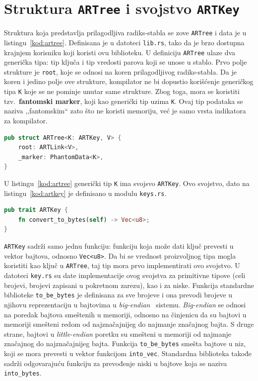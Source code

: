 \documentclass[12pt,oneside]{memoir}
\begin{document}
\section{Struktura \texttt{ARTree} i svojstvo \texttt{ARTKey}}
Struktura koja predstavlja prilagodljiva radiks-stabla se zove \texttt{ARTree}
i data je u listingu~\ref{kod:artree}. Definisana je u datoteci \texttt{lib.rs},
tako da je brzo dostupna krajnjem korisniku koji koristi ovu biblioteku.
U definiciju \texttt{ARTree} ulaze dva generička tipa: tip ključa i tip vredosti
parova koji se unose u stablo. Prvo polje strukture je \texttt{root}, koje se odnosi
na koren prilagodljivog radiks-stabla. Da je koren i jedino polje ove strukture,
kompilator ne bi dopustio korišćenje generičkog tipa \texttt{K} koje se ne pominje
unutar same strukture. Zbog toga, mora se koristiti tzv.\ \textbf{fantomski marker},
koji kao generički tip uzima \texttt{K}. Ovaj tip podataka se naziva ,,fantomskim``
zato što ne koristi memoriju, već je samo vrsta indikatora za kompilator.

\begin{lstlisting}[language=Rust,
                   caption={Definicija strukture \texttt{ARTree}},
                   label={kod:artree}]
pub struct ARTree<K: ARTKey, V> {
    root: ARTLink<V>,
    _marker: PhantomData<K>,
}
\end{lstlisting}

U listingu~\ref{kod:artree} generički tip \texttt{K} ima svojsvo \texttt{ARTKey}.
Ovo svojstvo, dato na listingu~\ref{kod:artkey} je definisano u
modulu \texttt{keys.rs}.

\begin{lstlisting}[language=Rust,
                   caption={Definicija svojstva \texttt{ARTKey}},
                   label={kod:artkey}]
pub trait ARTKey {
    fn convert_to_bytes(self) -> Vec<u8>;
}
\end{lstlisting}

\texttt{ARTKey} sadrži samo jednu funkciju: funkciju koja može dati ključ
prevesti u vektor bajtova, odnosno \texttt{Vec<u8>}. Da bi se vrednost
proizvoljnog tipa mogla koristiti kao ključ u \texttt{ARTree}, taj tip mora prvo
implementirati ovo svojstvo. U datoteci \texttt{key.rs} su date
implementacije ovog svojstva za primitivne tipove (celi brojevi, brojevi zapisani
u pokretnom zarezu), kao i za niske. Funkcija standardne biblioteke
\texttt{to\_be\_bytes} je definisana za sve brojeve i ona prevodi brojeve u
njihovu reprezentaciju u bajtovima u \textit{big-endian}~\cite{endianness}
sistemu. \textit{Big-endian} se odnosi na poredak bajtova smeštenih u memoriji,
odnosno na činjenicu da su bajtovi u memoriji smešteni redom od najznačajnijeg
do najmanje značajnog bajta. S druge strane, bajtovi u \textit{little-endian}
poretku su smešteni u memoriji od najmanje značajnog do najznačajnijeg bajta.
Funkcija \texttt{to\_be\_bytes} smešta bajtove u niz,
koji se mora prevesti u vektor funkcijom \texttt{into\_vec}.
Standardna biblioteka takođe sadrži odgovarajuću funkciju za prevođenje
niski u bajtove koja se naziva \texttt{into\_bytes}.
\end{document}
